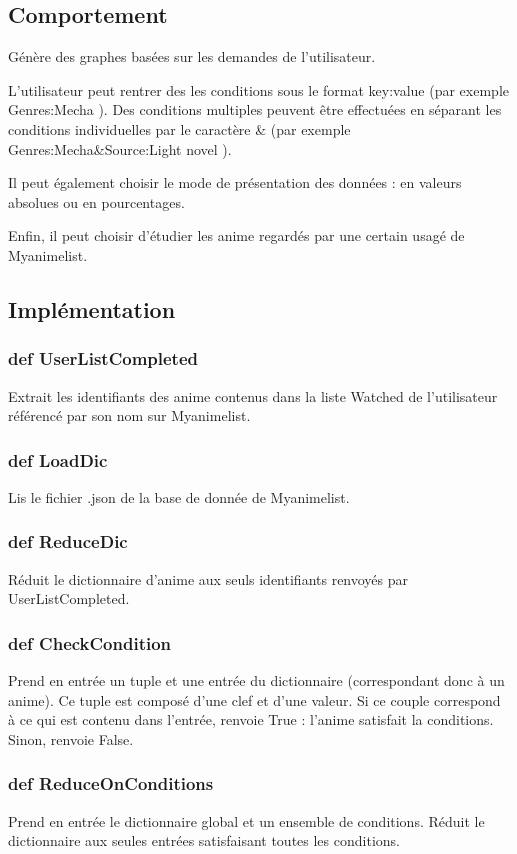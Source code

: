 \documentclass[a4paper,12pt]{article}
\begin{document}
\subsection{Comportement}
Génère des graphes basées sur les demandes de l'utilisateur. 

L'utilisateur peut rentrer des les conditions sous le format key:value (par exemple \og Genres:Mecha \fg). Des conditions multiples peuvent être effectuées en séparant les conditions individuelles par le caractère \og \& \fg{} (par exemple \og Genres:Mecha\&Source:Light novel \fg).  

Il peut également choisir le mode de présentation des données : en valeurs absolues ou en pourcentages.

Enfin, il peut choisir d'étudier les anime regardés par une certain usagé de Myanimelist.
\subsection{Implémentation}
\subsubsection{def UserListCompleted}
Extrait les identifiants des anime contenus dans la liste \og Watched \fg{} de l'utilisateur référencé par son nom sur Myanimelist.
\subsubsection{def LoadDic}
Lis le fichier .json de la base de donnée de Myanimelist.
\subsubsection{def ReduceDic}
Réduit le dictionnaire d'anime aux seuls identifiants renvoyés par UserListCompleted.
\subsubsection{def CheckCondition}
Prend en entrée un tuple et une entrée du dictionnaire (correspondant donc à un anime). Ce tuple est composé d'une clef et d'une valeur. Si ce couple correspond à ce qui est contenu dans l'entrée, renvoie True : l'anime satisfait la conditions. Sinon, renvoie False.
\subsubsection{def ReduceOnConditions}
Prend en entrée le dictionnaire global et un ensemble de conditions. Réduit le dictionnaire aux seules entrées satisfaisant toutes les conditions.
\end{document}
